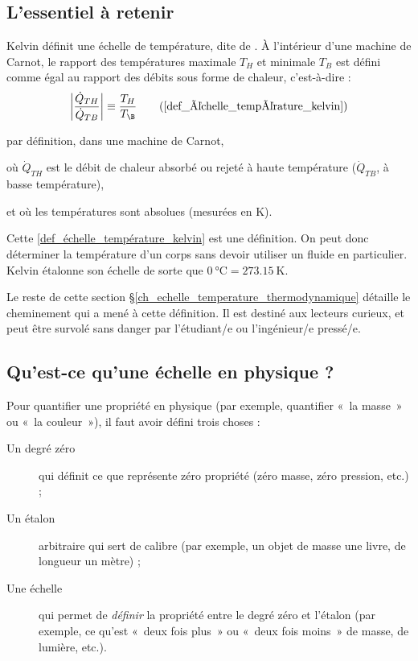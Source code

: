 	\subsection{L’essentiel à retenir}
	
		Kelvin définit une échelle de température, dite de . À l’intérieur d’une machine de Carnot, le rapport des températures maximale $T_H$ et minimale $T_B$ est défini comme égal au rapport des débits sous forme de chaleur, c’est-à-dire :
		\begin{equation}
			\left| \frac{\dot Q_{TH}}{\dot Q_{TB}} \right| \equiv \frac{T_H}{T_\B } \tag{\ref{def_échelle_température_kelvin}}
		\end{equation}
		\begin{equationterms}
			\item par définition, dans une machine de Carnot,
			\item où \tab $\dot Q_{TH}$ \tab est le débit de chaleur absorbé ou rejeté à haute température ($\dot Q_{TB}$, à basse température),
			\item et où les températures sont absolues (mesurées en \si{\kelvin}).
		\end{equationterms}

		Cette \cref{def_échelle_température_kelvin} est une définition. On peut donc déterminer la température d’un corps sans devoir utiliser un fluide en particulier. Kelvin étalonne son échelle de sorte que $\SI{0}{\degreeCelsius} = \SI{273,15}{\kelvin}$.
		
		Le reste de cette section \S\ref{ch_echelle_temperature_thermodynamique} détaille le cheminement qui a mené à cette définition. Il est destiné aux lecteurs curieux, et peut être survolé sans danger par l’étudiant/e ou l’ingénieur/e pressé/e.


	\subsection{Qu’est-ce qu’une échelle en physique ?}
	
		Pour quantifier une propriété en physique (par exemple, quantifier «~la masse~» ou «~la couleur~»), il faut avoir défini trois choses :
		
		\begin{description}
			\item [Un degré zéro] qui définit ce que représente zéro propriété (zéro masse, zéro pression, etc.) ;
			\item [Un étalon] arbitraire qui sert de calibre (par exemple, un objet de masse une livre, de longueur un mètre) ;
			\item [Une échelle] qui permet de \emph{définir} la propriété entre le degré zéro et l’étalon (par exemple, ce qu’est «~deux fois plus~» ou «~deux fois moins~» de masse, de lumière, etc.).
		\end{description}


